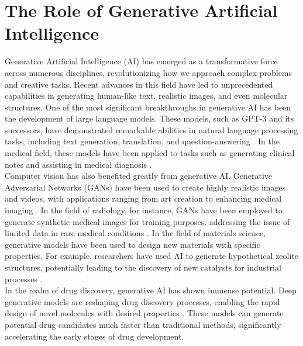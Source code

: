 \section{The Role of Generative Artificial Intelligence} 
Generative Artificial Intelligence (AI) has emerged as a transformative force across numerous disciplines, revolutionizing how we approach complex problems and creative tasks. Recent advances in this field have led to unprecedented capabilities in generating human-like text, realistic images, and even molecular structures. One of the most significant breakthroughs in generative AI has been the development of large language models. These models, such as GPT-3 and its successors, have demonstrated remarkable abilities in natural language processing tasks, including text generation, translation, and question-answering \cite{lewis2021rag}. In the medical field, these models have been applied to tasks such as generating clinical notes and assisting in medical diagnosis \cite{krishna2021soap}. \\

Computer vision has also benefited greatly from generative AI. Generative Adversarial Networks (GANs) have been used to create highly realistic images and videos, with applications ranging from art creation to enhancing medical imaging \cite{pinaya2023monai}. In the field of radiology, for instance, GANs have been employed to generate synthetic medical images for training purposes, addressing the issue of limited data in rare medical conditions \cite{chen2021synmed}. In the field of materials science, generative models have been used to design new materials with specific properties. For example, researchers have used AI to generate hypothetical zeolite structures, potentially leading to the discovery of new catalysts for industrial processes \cite{mok2024catalyst}. \\

In the realm of drug discovery, generative AI has shown immense potential. Deep generative models are reshaping drug discovery processes, enabling the rapid design of novel molecules with desired properties \cite{deng2022artificial}. These models can generate potential drug candidates much faster than traditional methods, significantly accelerating the early stages of drug development.

